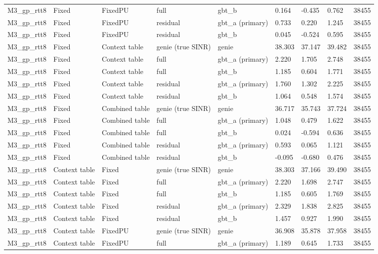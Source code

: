 \documentclass[10pt]{article}
\begin{document}
\begin{landscape}
\begin{longtable}{@{}lllllllll@{}}
M3\_gp\_rtt8 & Fixed & FixedPU & full & gbt\_b & 0.164 & -0.435 & 0.762 & 38455 \\
M3\_gp\_rtt8 & Fixed & FixedPU & residual & gbt\_a (primary) & 0.733 & 0.220 & 1.245 & 38455 \\
M3\_gp\_rtt8 & Fixed & FixedPU & residual & gbt\_b & 0.045 & -0.524 & 0.595 & 38455 \\
M3\_gp\_rtt8 & Fixed & Context table & genie (true SINR) & genie & 38.303 & 37.147 & 39.482 & 38455 \\
M3\_gp\_rtt8 & Fixed & Context table & full & gbt\_a (primary) & 2.220 & 1.705 & 2.748 & 38455 \\
M3\_gp\_rtt8 & Fixed & Context table & full & gbt\_b & 1.185 & 0.604 & 1.771 & 38455 \\
M3\_gp\_rtt8 & Fixed & Context table & residual & gbt\_a (primary) & 1.760 & 1.302 & 2.225 & 38455 \\
M3\_gp\_rtt8 & Fixed & Context table & residual & gbt\_b & 1.064 & 0.548 & 1.574 & 38455 \\
M3\_gp\_rtt8 & Fixed & Combined table & genie (true SINR) & genie & 36.717 & 35.743 & 37.724 & 38455 \\
M3\_gp\_rtt8 & Fixed & Combined table & full & gbt\_a (primary) & 1.048 & 0.479 & 1.622 & 38455 \\
M3\_gp\_rtt8 & Fixed & Combined table & full & gbt\_b & 0.024 & -0.594 & 0.636 & 38455 \\
M3\_gp\_rtt8 & Fixed & Combined table & residual & gbt\_a (primary) & 0.593 & 0.065 & 1.121 & 38455 \\
M3\_gp\_rtt8 & Fixed & Combined table & residual & gbt\_b & -0.095 & -0.680 & 0.476 & 38455 \\
M3\_gp\_rtt8 & Context table & Fixed & genie (true SINR) & genie & 38.303 & 37.166 & 39.490 & 38455 \\
M3\_gp\_rtt8 & Context table & Fixed & full & gbt\_a (primary) & 2.220 & 1.698 & 2.747 & 38455 \\
M3\_gp\_rtt8 & Context table & Fixed & full & gbt\_b & 1.185 & 0.605 & 1.769 & 38455 \\
M3\_gp\_rtt8 & Context table & Fixed & residual & gbt\_a (primary) & 2.329 & 1.838 & 2.825 & 38455 \\
M3\_gp\_rtt8 & Context table & Fixed & residual & gbt\_b & 1.457 & 0.927 & 1.990 & 38455 \\
M3\_gp\_rtt8 & Context table & FixedPU & genie (true SINR) & genie & 36.908 & 35.878 & 37.958 & 38455 \\
M3\_gp\_rtt8 & Context table & FixedPU & full & gbt\_a (primary) & 1.189 & 0.645 & 1.733 & 38455 \\

\end{longtable}
\end{landscape}
\end{document}
